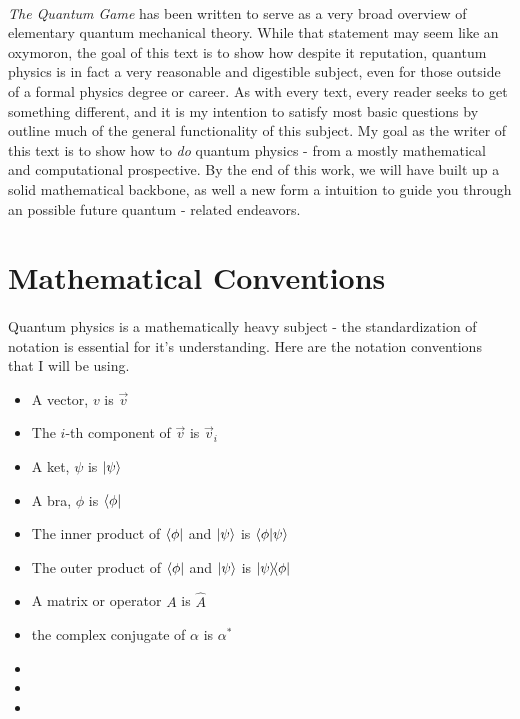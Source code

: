 \documentclass[12pt,letterpaper]{book}
\begin{document}
\paragraph*{}\textit{The Quantum Game} has been written to serve as a very broad overview of elementary quantum mechanical theory. While that statement may seem like an oxymoron, the goal of this text is to show how despite it reputation, quantum physics is in fact a very reasonable and digestible subject, even for those outside of a formal physics degree or career. As with every text, every reader seeks to get something different, and it is my intention to satisfy most basic questions  by outline much of the general functionality of this subject. My goal as the writer of this text is to show how to \textit{do} quantum physics - from a mostly mathematical and computational prospective. By the end of this work, we will have built up a solid mathematical backbone, as well a new form a intuition to guide you through an possible future quantum - related endeavors.

\vspace*{6cm}

\pagebreak


\section*{Mathematical Conventions}
\paragraph*{}Quantum physics is a mathematically heavy subject - the standardization of notation is essential for it's understanding. Here are the notation conventions that I will be using.

\begin{itemize}

\item A vector, $v$ is $\vec{v}$
\item The $i$-th component of $\vec{v}$ is $\vec{v}_i$
\item A ket, $\psi$ is $\ket{\psi}$
\item A bra, $\phi$ is $\bra{\phi}$
\item The inner product of $\bra{\phi}$ and $\ket{\psi}$ is 
$\braket{\phi}{\psi}$
\item The outer product of $\bra{\phi}$ and $\ket{\psi}$ is 
$\ketbra{\psi}{\phi}$
\item A matrix or operator $A$ is $\hat{A}$
\item the complex conjugate of $\alpha$ is $\alpha^*$
\item
\item
\item

\end{itemize}
\end{document}
